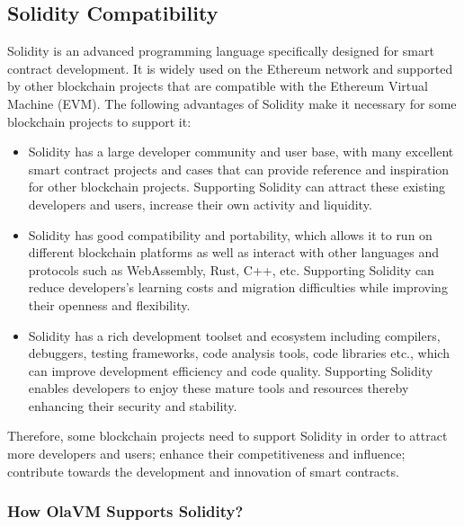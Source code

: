 \subsection{Solidity Compatibility}\label{section: solidity-compatibility}

Solidity is an advanced programming language specifically designed for smart contract development. It is widely used on the Ethereum network and supported by other blockchain projects that are compatible with the Ethereum Virtual Machine (EVM). The following advantages of Solidity make it necessary for some blockchain projects to support it:

\begin{itemize}
    \item Solidity has a large developer community and user base, with many excellent smart contract projects and cases that can provide reference and inspiration for other blockchain projects. Supporting Solidity can attract these existing developers and users, increase their own activity and liquidity.
    \item Solidity has good compatibility and portability, which allows it to run on different blockchain platforms as well as interact with other languages and protocols such as WebAssembly, Rust, C++, etc. Supporting Solidity can reduce developers's learning costs and migration difficulties while improving their openness and flexibility.
    \item Solidity has a rich development toolset and ecosystem including compilers, debuggers, testing frameworks, code analysis tools, code libraries etc., which can improve development efficiency and code quality. Supporting Solidity enables developers to enjoy these mature tools and resources thereby enhancing their security and stability.
\end{itemize}

Therefore, some blockchain projects need to support Solidity in order to attract more developers and users; enhance their competitiveness and influence; contribute towards the development and innovation of smart contracts.


\subsubsection{How OlaVM Supports Solidity?}

